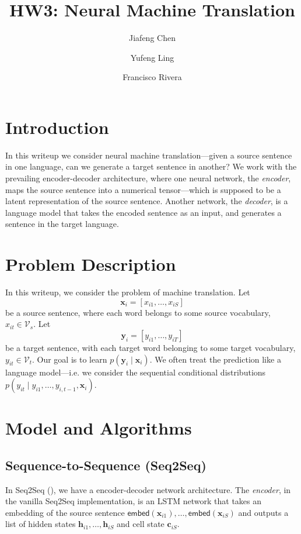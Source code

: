 \documentclass[12pt]{article}
\title{HW3: Neural Machine Translation}
\author{Jiafeng Chen \and Yufeng Ling \and
Francisco Rivera}
\newcommand{\sts}{Seq2Seq}
\newcommand{\embed}{\mathsf{embed}}
\begin{document}
\maketitle

\section{Introduction}
In this writeup we consider neural machine translation---given a source sentence in one language, can we generate a target sentence in another? We work with the prevailing encoder-decoder architecture, where one neural network, the \emph{encoder}, maps the source sentence into a numerical tensor---which is supposed to be a latent representation of the source sentence. Another network, the \emph{decoder}, is a language model that takes the encoded sentence as an input, and generates a sentence in the target language. 

\section{Problem Description}
In this writeup, we consider the problem of machine translation. Let 
\begin{equation}
	\bm x_i = [x_{i1},\ldots,x_{iS}]
\end{equation}
be a source sentence, where each word belongs to some source vocabulary, $x_{it} \in \mathcal V_s$. Let 
\begin{equation}
	\bm y_i = [y_{i1},\ldots,y_{iT}]
\end{equation}
be a target sentence, with each target word belonging to some target vocabulary, $y_{it} \in \mathcal V_t$. Our goal is to learn $p(\bm y_i \mid \bm x_i)$. We often treat the prediction like a language model---i.e. we consider the sequential conditional distributions $p(y_{it} \mid y_{i1},\ldots,y_{i,t-1}, \bm x_i)$.


\section{Model and Algorithms}

\subsection{Sequence-to-Sequence (\sts)}
\label{sub:seq2seq}
In \sts{} (\cite{sutskever2014sequence}), we have a encoder-decoder network architecture. The \emph{encoder}, in the vanilla \sts{} implementation, is an LSTM network that takes an embedding of the source sentence $\embed(\bm x_{i1}),\ldots,\embed(\bm x_{iS})$ and outputs a list of hidden states $\bm h_{i1},\ldots, \bm h_{iS}$ and cell state $\bm c_{iS}$.
\end{document}
